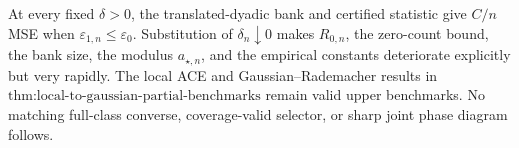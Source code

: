 At every fixed \(\delta>0\), the translated-dyadic bank and certified statistic give \(C/n\) MSE when \(\varepsilon_{1,n}\le\varepsilon_0\).  Substitution of \(\delta_n\downarrow0\) makes \(R_{0,n}\), the zero-count bound, the bank size, the modulus \(a_{\star,n}\), and the empirical constants deteriorate explicitly but very rapidly.  The local ACE and Gaussian--Rademacher results in \(\text{thm:local-to-gaussian-partial-benchmarks}\) remain valid upper benchmarks.  No matching full-class converse, coverage-valid selector, or sharp joint phase diagram follows.